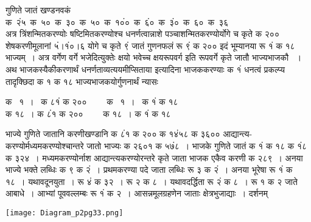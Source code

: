 \documentclass[11pt, openany]{book}
\begin{document}
\begin{sloppypar}
गुणिते जातं खण्डनवकं\\

क \,२ं५ \,क \,५० \,क \,३० \,क \,५० \,क \,१०ं० \,क \,६ं० \,क \,३ं० \,क \,६० \,क \,३६\\

अत्र त्रिंशन्मितकरण्योः षष्टिमितकरण्योश्च धनर्णत्वान्नाशे पञ्चाशन्मितकरण्योर्योगे च कृते क २०० शेषकरणीमूलानां ५ं।१ं०।६ योगे च कृते ९ं जातं गुणनफलं रू ९ं क २०० इदं भूम्यानया रू १ं क १८ भाज्यम्~। अत्र वर्गेण वर्गे भजेदित्युक्तेः क्षयो भवेच्च क्षयरूपवर्ग इति रूपवर्गे कृते जातौ भाज्यभाजकौ ~।\\

अथ भाजकस्यैकीकरणार्थं धनर्णताव्यत्ययमीप्सिताया इत्यादिना भाजककरण्याः क १ं धनत्वं प्रकल्प्य तादृक्छिदा क १ क १८ भाज्यभाजकयोर्गुणनार्थं न्यासः
\vspace{-1mm}

\begin{center}
क ~१~। ~क ८१ं क २०० ~~~~क ~१~। ~क १ं क १८\\
क १८~। क ८ं१ क २०० ~~~~क १८~। क १ं क १८
\end{center}
\vspace{-1mm}

भाज्ये गुणिते जातानि करणीखण्डानि क ८ं१ क २०० क १४ं५८ क ३६०० आद्यान्त्य-करण्योर्मध्यमकरण्योश्चान्तरे जातो भाज्यः क २६०१ क ५७ं८~। भाजके गुणिते जातं क १ं क १८ क १ं८ क ३२४~। मध्यमकरण्योर्नाश आद्यान्त्यकरण्योरन्तरे कृते जाता भाजक एकैव करणी क २८९~। अनया भाज्ये भक्ते लब्धिः क ९ क २ं~। प्रथमकरण्या पदे जाता लब्धिः रू ३ क २ं~। अनया भूरेषा रू १ं क १८~। यथावदूनयुता~। रू ४ं क ३२~। रू २ क ८~। यथावदर्द्धिता रू २ं क ८~। रू १ क २ जाते आबाधे~। आभ्यां पूववल्लम्बः रू १ं क २~। आसन्नमूलग्रहणेन जाताः क्षेत्रभुजाद्याः~। दर्शनम्

\begin{center}
\texttt{[image: Diagram\_p2pg33.png]}
\end{center}
\end{sloppypar}

\newpage
\end{document}
